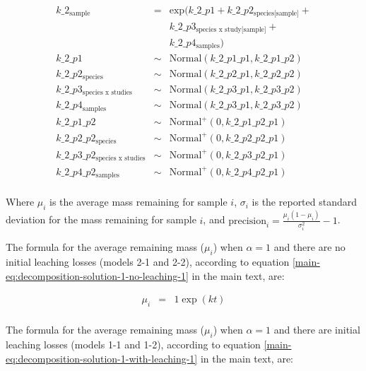 \documentclass[
  12pt,
]{article}
\begin{document}
\begin{equation}
\begin{aligned}
k\_2_{\text{sample}} & = & \text{exp}(k\_2\_p1 + k\_2\_p2_{\text{species[sample]}} + \\
                         && k\_2\_p3_{\text{species x study[sample]}} + \\
                         && k\_2\_p4_{\text{samples}})\\
k\_2\_p1 & \sim & \text{Normal}(k\_2\_p1\_p1, k\_2\_p1\_p2)\\
k\_2\_p2_{\text{species}} & \sim & \text{Normal}(k\_2\_p2\_p1, k\_2\_p2\_p2)\\
k\_2\_p3_{\text{species x studies}} & \sim & \text{Normal}(k\_2\_p3\_p1, k\_2\_p3\_p2)\\
k\_2\_p4_{\text{samples}} & \sim & \text{Normal}(k\_2\_p3\_p1, k\_2\_p3\_p2)\\
k\_2\_p1\_p2 & \sim &  \text{Normal}^+(0, k\_2\_p1\_p2\_p1)\\
k\_2\_p2\_p2_{\text{species}} & \sim &  \text{Normal}^+(0, k\_2\_p2\_p2\_p1)\\
k\_2\_p3\_p2_{\text{species x studies}} & \sim &  \text{Normal}^+(0, k\_2\_p3\_p2\_p1)\\
k\_2\_p4\_p2_{\text{samples}} & \sim &  \text{Normal}^+(0, k\_2\_p4\_p2\_p1)\\
\label{eq:sup-model-1}
\end{aligned}
\end{equation}

Where \(\mu_i\) is the average mass remaining for sample \(i\), \(\sigma_i\) is the reported standard deviation for the mass remaining for sample \(i\), and \(\text{precision}_i = \frac{\mu_i(1 - \mu_i)}{\sigma_i^2} -1\).

The formula for the average remaining mass (\(\mu_i\)) when \(\alpha=1\) and there are no initial leaching losses (models 2-1 and 2-2), according to equation \ref{main-eq:decomposition-solution-1-no-leaching-1} in the main text, are:

\begin{equation}
\begin{aligned}
\mu_i & = & 1 \exp(k t)\\
\label{eq:sup-model-2}
\end{aligned}
\end{equation}

The formula for the average remaining mass (\(\mu_i\)) when \(\alpha=1\) and there are initial leaching losses (models 1-1 and 1-2), according to equation \ref{main-eq:decomposition-solution-1-with-leaching-1} in the main text, are:
\end{document}
